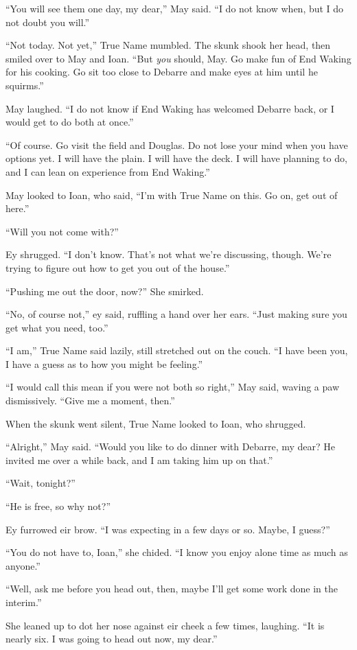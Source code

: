 ``You will see them one day, my dear,'' May said. ``I do not know when, but I do not doubt you will.''

``Not today. Not yet,'' True Name mumbled. The skunk shook her head, then smiled over to May and Ioan. ``But \emph{you} should, May. Go make fun of End Waking for his cooking. Go sit too close to Debarre and make eyes at him until he squirms.''

May laughed. ``I do not know if End Waking has welcomed Debarre back, or I would get to do both at once.''

``Of course. Go visit the field and Douglas. Do not lose your mind when you have options yet. I will have the plain. I will have the deck. I will have planning to do, and I can lean on experience from End Waking.''

May looked to Ioan, who said, ``I'm with True Name on this. Go on, get out of here.''

``Will you not come with?''

Ey shrugged. ``I don't know. That's not what we're discussing, though. We're trying to figure out how to get you out of the house.''

``Pushing me out the door, now?'' She smirked.

``No, of course not,'' ey said, ruffling a hand over her ears. ``Just making sure you get what you need, too.''

``I am,'' True Name said lazily, still stretched out on the couch. ``I have been you, I have a guess as to how you might be feeling.''

``I would call this mean if you were not both so right,'' May said, waving a paw dismissively. ``Give me a moment, then.''

When the skunk went silent, True Name looked to Ioan, who shrugged.

``Alright,'' May said. ``Would you like to do dinner with Debarre, my dear? He invited me over a while back, and I am taking him up on that.''

``Wait, tonight?''

``He is free, so why not?''

Ey furrowed eir brow. ``I was expecting in a few days or so. Maybe, I guess?''

``You do not have to, Ioan,'' she chided. ``I know you enjoy alone time as much as anyone.''

``Well, ask me before you head out, then, maybe I'll get some work done in the interim.''

She leaned up to dot her nose against eir cheek a few times, laughing. ``It is nearly six. I was going to head out now, my dear.''

